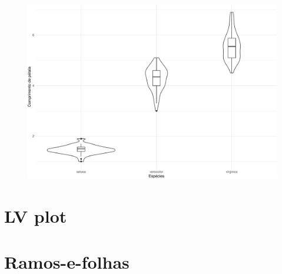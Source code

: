\documentclass[
  10pt,
  ignorenonframetext,
]{beamer}
\begin{document}
\begin{frame}
\begin{figure}

{\centering \includegraphics[width=1\textwidth,height=\textheight]{exploracao-visualizacao_files/figure-beamer/unnamed-chunk-114-1.pdf}

}

\end{figure}
\end{frame}

\hypertarget{lv-plot}{%
\section{LV plot}\label{lv-plot}}

\hypertarget{ramos-e-folhas}{%
\section{Ramos-e-folhas}\label{ramos-e-folhas}}
\end{document}

